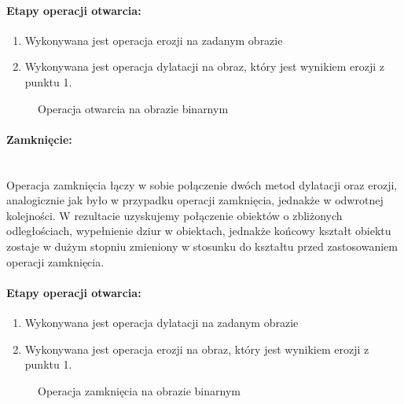 \documentclass[a4paper,12pt,twoside,openany]{report}
\newcommand{\ImgPath}{.}
\begin{document}
\paragraph{Etapy operacji otwarcia:}
\begin{enumerate}
	\item Wykonywana jest operacja erozji na zadanym obrazie
	\item Wykonywana jest operacja dylatacji na obraz, który jest wynikiem erozji z punktu 1.
\end{enumerate}

\begin{figure}[H]
	\centering
	\caption{Operacja otwarcia na obrazie binarnym}
\end{figure}

\paragraph{Zamknięcie:}\mbox{} \\
Operacja zamknięcia łączy w sobie połączenie dwóch metod dylatacji oraz erozji, analogicznie jak było w przypadku operacji zamknięcia, jednakże w odwrotnej kolejności. W rezultacie uzyskujemy połączenie obiektów o zbliżonych odległościach, wypełnienie dziur w obiektach, jednakże końcowy kształt obiektu zostaje w dużym stopniu zmieniony w stosunku do kształtu przed zastosowaniem operacji zamknięcia.

\paragraph{Etapy operacji otwarcia:}
\begin{enumerate}
	\item Wykonywana jest operacja dylatacji na zadanym obrazie
	\item Wykonywana jest operacja erozji na obraz, który jest wynikiem erozji z punktu 1.
\end{enumerate}

\begin{figure}[H]
	\centering
	\caption{Operacja zamknięcia na obrazie binarnym}
\end{figure}
\end{document}

